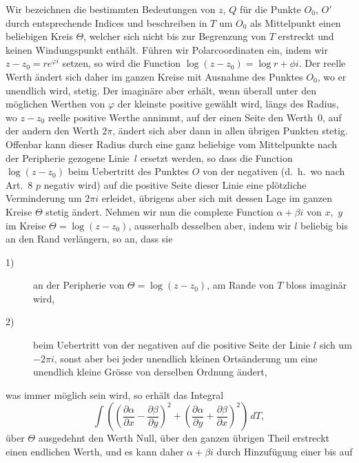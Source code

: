 \documentclass[a4paper,12pt]{article}
\begin{document}
Wir bezeichnen die bestimmten Bedeutungen von $z$, $Q$ f\"{u}r
die Punkte $O_0$, $O'$ durch entsprechende Indices und
beschreiben in $T$ um $O_0$ als Mittelpunkt einen beliebigen
Kreis $\Theta$, welcher sich nicht bis zur Begrenzung von $T$
erstreckt und keinen Windungspunkt enth\"{a}lt.  F\"{u}hren wir
Polarcoordinaten ein, indem wir
$z - z_0 = r e^{\varphi i}$
setzen, so wird die Function
$\log (z - z_0) = \log r + \phi i$.
Der reelle Werth \"{a}ndert sich daher im ganzen Kreise mit
Ausnahme des Punktes $O_0$, wo er unendlich wird, stetig.  Der
imagin\"{a}re aber erh\"{a}lt, wenn \"{u}berall unter den
m\"{o}glichen Werthen von $\varphi$ der kleinste positive
gew\"{a}hlt wird, l\"{a}ngs des Radius, wo $z - z_0$ reelle
positive Werthe annimmt, auf der einen Seite den Werth~$0$, auf
der andern den Werth $2\pi$, \"{a}ndert sich aber dann in allen
\"{u}brigen Punkten stetig.  Offenbar kann dieser Radius durch
eine ganz beliebige vom Mittelpunkte nach der Peripherie gezogene
Linie~$l$ ersetzt werden, so dass die Function $\log (z - z_0)$
beim Uebertritt des Punktes $O$ von der negativen (d.~h.\ wo nach
Art.~8 $p$ negativ wird) auf die positive Seite dieser Linie eine
pl\"{o}tzliche Verminderung um $2\pi i$ erleidet, \"{u}brigens
aber sich mit dessen Lage im ganzen Kreise $\Theta$ stetig
\"{a}ndert.  Nehmen wir nun die complexe Function
$\alpha + \beta i$ von $x$,~$y$ im Kreise
$\Theta = \log (z - z_0)$, ausserhalb desselben aber, indem wir
$l$ beliebig bis an den Rand verl\"{a}ngern, so an, dass sie
\begin{description}
\item[\textmd{1)}]
an der Peripherie von $\Theta = \log (z - z_0)$, am Rande von $T$
bloss imagin\"{a}r wird,
\item[\textmd{2)}]
beim Uebertritt von der negativen auf die positive Seite der
Linie $l$ sich um $-2\pi i$, sonst aber bei jeder unendlich
kleinen Orts\"{a}nderung um eine unendlich kleine Gr\"{o}sse von
derselben Ordnung \"{a}ndert,
\end{description}
was immer m\"{o}glich sein wird, so erh\"{a}lt das Integral
\[ \int
      \left(
         \left(
            \frac{\partial \alpha}{\partial x}
          - \frac{\partial \beta }{\partial y}
         \right)^2
       + \left(
            \frac{\partial \alpha}{\partial y}
          + \frac{\partial \beta }{\partial x}
         \right)^2
      \right) \, dT,\]
\"{u}ber $\Theta$ ausgedehnt den Werth Null, \"{u}ber den ganzen
\"{u}brigen Theil erstreckt einen endlichen Werth, und es kann
daher $\alpha + \beta i$ durch Hinzuf\"{u}gung einer bis auf
\end{document}
